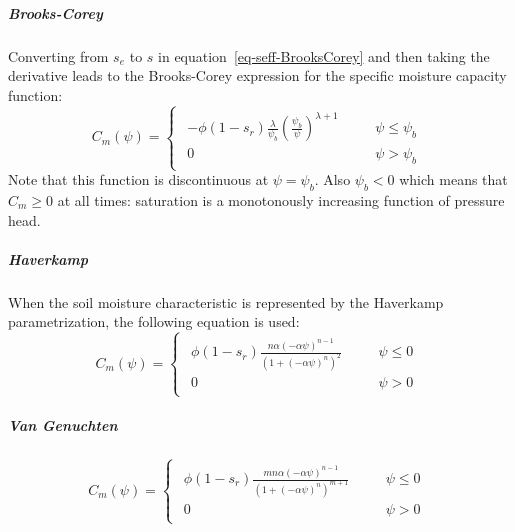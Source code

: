 \documentclass[fleqn]{article}
\begin{document}
\subparagraph{Brooks-Corey}
Converting from $s_e$ to $s$ in equation~\ref{eq-seff-BrooksCorey} and then taking the derivative leads to the Brooks-Corey expression for the specific moisture capacity function:
\begin{equation}
  C_m(\psi) =
  \begin{cases}
    \begin{aligned}
      - \phi ( 1 - s_r) \frac{\lambda}{\psi_b}
      \left(\frac{\psi_b}{\psi}\right)^{\lambda + 1} & \quad & \psi \leq \psi_b \\
      0                                              & \quad & \psi > \psi_b
    \end{aligned}
  \end{cases}
  \label{eq-Cm-BrooksCorey}
\end{equation}
Note that this function is discontinuous at $\psi = \psi_b$. Also
$\psi_b < 0$ which means that $C_m \geq 0$ at all times: saturation is a
monotonously increasing function of pressure head.
\subparagraph{Haverkamp}
When the soil moisture characteristic is represented by the Haverkamp
parametrization, the following equation is used:
\begin{equation}
  C_m(\psi) =
  \begin{cases}
    \begin{aligned}
      \phi ( 1 - s_r)
      \frac
      {
        n \alpha (-\alpha\psi)^{n-1}
      }
      {
        \left( 1 + \left( -\alpha\psi \right)^{n} \right)^2
      }
        & \quad & \psi \leq 0 \\
      0 & \quad & \psi > 0
    \end{aligned}
  \end{cases}
  \label{eq-Cm-Haverkamp}
\end{equation}

\subparagraph{Van Genuchten}
\begin{equation}
  C_m(\psi) =
  \begin{cases}
    \begin{aligned}
      \phi ( 1 - s_r)
      \frac
      {
        m n \alpha (-\alpha\psi)^{n-1}
      }
      {
        \left( 1 + \left( -\alpha\psi \right)^{n} \right)^{m+1}
      }
        & \quad & \psi \leq 0 \\
      0 & \quad & \psi > 0
    \end{aligned}
  \end{cases}
  \label{eq-Cm-vanGenuchten}
\end{equation}
\end{document}
